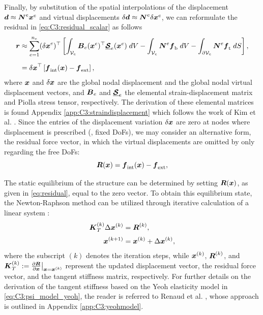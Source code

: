 Finally, by substitution of the spatial interpolations of the displacement ${\boldsymbol{d}} \approx {\boldsymbol{N}}^e {\boldsymbol{x}}^e$ and virtual displacements $\delta {\boldsymbol{d}} \approx {\boldsymbol{N}}^e\delta {\boldsymbol{x}}^e$, we can reformulate the residual in \eqref{eq:C3:residual_scalar} as follows
%
\begin{align}
\boldsymbol{r}	& \approx \sum_{e=1}^{n_e} ({\delta {\boldsymbol{x}}}^e)^\top \left[\int_{\mathcal{V}_e} {\boldsymbol{B}}_e({\boldsymbol{x}}^e)^\top \underline{\boldsymbol{\mathcal{S}}}_e({\boldsymbol{x}}^e) \; dV  - \int_{\mathcal{V}_e} {\boldsymbol{N}}^{e} {\boldsymbol{f}}_{\textrm{b}} \; dV  - \int_{\partial \mathcal{V}_e} {\boldsymbol{N}}^{e} {\boldsymbol{f}}_{\textrm{t}} \; dS \right], \notag \\[0.5em]
& = {\delta {\boldsymbol{x}}}^\top \left[ {\boldsymbol{f}}_{\textrm{int}}({\boldsymbol{x}}) - {\boldsymbol{f}}_{\textrm{ext}} \right],
\end{align}
%
where ${\boldsymbol{x}}$ and $\delta {\boldsymbol{x}}$ are the global nodal displacement and the global nodal virtual displacement vectors, and ${\boldsymbol{B}}_e$ and $\underline{\boldsymbol{\mathcal{S}}}_e$ the elemental strain-displacement matrix and Piolla stress tensor, respectively. The derivation of these elemental matrices is found Appendix \ref{app:C3:straindisplacement} which follows the work of Kim et al. \cite{Kim2018}. Since the entries of the displacement variation ${\delta {\boldsymbol{x}}}$ are zero at nodes where displacement is prescribed (\ie, fixed DoFs), we may consider an alternative form, the residual force vector, in which the virtual displacements are omitted by only regarding the free DoFs:
%
\begin{equation}
{\boldsymbol{R}}({\boldsymbol{x}}) = {\boldsymbol{f}}_{\textrm{int}}({\boldsymbol{x}}) - {\boldsymbol{f}}_{\textrm{ext}},
\label{eq:residual}
\end{equation}
%

The static equilibrium of the structure can be determined by setting ${\boldsymbol{R}}({\boldsymbol{x}})$, as given in \eqref{eq:residual}, equal to the zero vector. To obtain this equilibrium state, the Newton-Raphson method can be utilized through iterative calculation of a linear system \cite{Gain2013Dec,Kim2018,Holzapfel2002}:
%
\begin{align}
{\boldsymbol{K}}_T^{(k)} \Delta {\boldsymbol{x}}^{(k)} & = {\boldsymbol{R}}^{(k)}, \notag \\[0.25em]
{\boldsymbol{x}}^{(k+1)} & = {\boldsymbol{x}}^{(k)} + \Delta {\boldsymbol{x}}^{(k)}, \notag
\end{align}
%
where the subscript $(k)$ denotes the iteration steps, while ${\boldsymbol{x}}^{(k)}$, ${\boldsymbol{R}}^{(k)}$, and ${\boldsymbol{K}}_T^{(k)}:=\tfrac{\partial {\boldsymbol{R}}}{\partial {\boldsymbol{x}}}\big|_{{\boldsymbol{x}} = {\boldsymbol{x}}^{(k)}}$ represent the updated displacement vector, the residual force vector, and the tangent stiffness matrix, respectively. For further details on the derivation of the tangent stiffness based on the Yeoh elasticity model in \eqref{eq:C3:psi_model_yeoh}, the reader is referred to Renaud et al. \cite{Renaud2011}, whose approach is outlined in Appendix \ref{app:C3:yeohmodel}.

